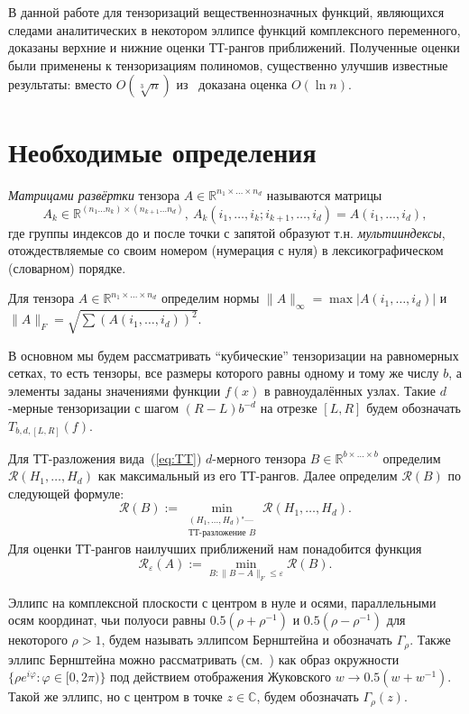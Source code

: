 \documentclass[3p]{cmmp}%
\numberwithin{equation}{section}
\begin{document}
В данной работе для тензоризаций вещественнозначных функций, являющихся следами аналитических в 
некотором эллипсе функций комплексного переменного, доказаны верхние и нижние оценки ТТ-рангов приближений.
Полученные оценки были применены к тензоризациям полиномов, существенно улучшив известные результаты: вместо $O(\sqrt[3]{n})$ из~\cite{Vysotsky2020} доказана оценка $O(\ln n)$.
	
\section{Необходимые определения}
\emph{Матрицами развёртки} тензора $A \in \mathbb{R}^{n_1 \times \dots \times n_d}$ называются матрицы
\[
A_k \in \mathbb{R}^{(n_1\dots n_k) \times (n_{k+1}\dots n_d)},~A_k(i_1, \dots, i_k; i_{k+1}, \dots, i_d) = A(i_1, \dots, i_d),
\]
где группы индексов до и после точки с запятой образуют т.н. \emph{мультииндексы}, отождествляемые со своим номером (нумерация с нуля) в лексикографическом (словарном) порядке.

Для тензора $A \in \mathbb{R}^{n_1 \times \dots \times n_d}$ определим нормы $\|A\|_{\infty} = \max{|A(i_1, \dots, i_d)|}$ и $\|A\|_F = \sqrt{\sum (A(i_1, \dots, i_d))^2}$.

В основном мы будем рассматривать ``кубические'' тензоризации на равномерных сетках, то есть тензоры, все размеры которого равны одному и тому же числу $b$, а элементы заданы значениями функции $f(x)$ в равноудалённых узлах.
Такие $d$-мерные тензоризации с шагом $(R-L)b^{-d}$ на отрезке $[L, R]$ будем обозначать $T_{b, d, [L,R]}(f)$.

Для ТТ-разложения вида~(\ref{eq:TT}) $d$-мерного тензора $B \in \mathbb{R}^{b\times\dots\times b}$ определим $\mathcal{R}(H_1, \dots, H_d)$ как максимальный из его ТТ-рангов.
Далее определим
$\mathcal{R}(B)$ по следующей формуле:
\[
\mathcal{R}(B) := \min_{\substack{(H_1,\dots,H_d) \text{"---} \\ \text{ТТ-разложение }B}}\mathcal{R}(H_1, \dots, H_d).
\]
Для оценки ТТ-рангов наилучших приближений нам понадобится функция
\[
\mathcal{R}_\varepsilon(A) := \min_{B:\|B - A\|_F \leq \varepsilon} \mathcal{R}(B).
\]	


Эллипс на комплексной плоскости с центром в нуле и осями, параллельными осям координат, чьи полуоси равны $0.5(\rho + \rho^{-1})$ и $0.5 (\rho - \rho^{-1})$ для некоторого $\rho > 1$, будем называть эллипсом Бернштейна и обозначать $\Gamma_{\rho}$. 
Также эллипс Бернштейна можно рассматривать (см.~\cite{MNA}) как образ окружности $\{\rho e^{i \varphi}: \varphi \in [0, 2\pi) \}$ под действием отображения Жуковского $w \to 0.5(w + w^{-1})$. 
Такой же эллипс, но с центром в точке $z \in \mathbb{C}$, будем обозначать $\Gamma_{\rho}(z)$.
\end{document}
